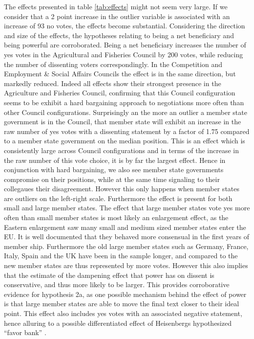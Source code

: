 The effects presented in table \ref{tab:effects} might not seem very large. If we consider that a 2 point increase in the outlier variable is associated with an increase of 93 no votes, the effects become substantial. Considering the direction and size of the effects, the hypotheses relating to being a net beneficiary and being powerful are corroborated. Being a net beneficiary increases the number of yes votes in the Agricultural and Fisheries Council by 200 votes, while reducing the number of dissenting voters correspondingly. In the Competition and Employment \& Social Affairs Councils the effect is in the same direction, but markedly reduced. Indeed all effects show their strongest presence in the Agriculture and Fisheries Council, confirming that this Council configuration seems to be exhibit a hard bargaining approach to negotiations more often than other Council configurations. Surprisingly an the more an outlier a member state government is in the Council, that member state will exhibit an increase in the raw number of yes votes with a dissenting statement by a factor of 1.75 compared to a member state government on the median position. This is an effect which is consistently large across Council configurations and in terms of the increase in the raw number of this vote choice, it is by far the largest effect. Hence in conjunction with hard bargaining, we also see member state governments compromise on their positions, while at the same time signaling to their collegaues their disagreement. However this only happens when member states are outliers on the left-right scale. Furthermore the effect is present for both small and large member states. The effect that large member states vote yes more often than small  member states is most likely an enlargement effect, as the Eastern enlargement saw many small and medium sized member states enter the EU. It is well documented that they behaved more consensual in the first years of member ship. Furthermore the old large member states such as Germany, France, Italy, Spain and the UK have been in the sample longer, and compared to the new member states are thus represented by more votes. However this also implies that the estimate of the dampening effect that power has on dissent is conservative, and thus more likely to be larger. This provides corroborative evidence for hypothesis 2a, as one possible mechanism behind the effect of power is that large member states are able to move the final text closer to their ideal point. This effect also includes yes votes with an associated negative statement, hence alluring to a possible differentiated effect of Heisenbergs hypothesized ``favor bank'' \citep[p. 69]{Heisenberg2005}. 

